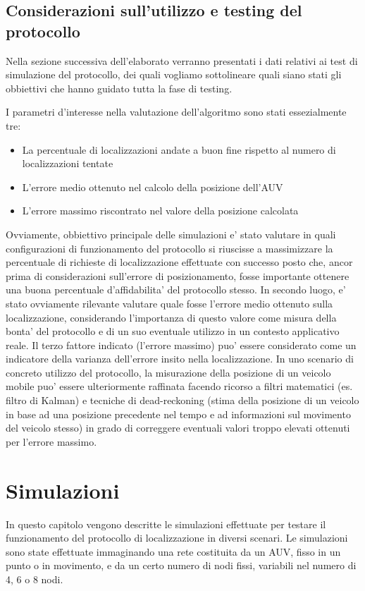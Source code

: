 \documentclass[Lau,binding=0.6cm]{sapthesis}
\begin{document}
\section{Considerazioni sull'utilizzo e testing del protocollo}
\par
Nella sezione successiva dell'elaborato verranno presentati i dati relativi ai test di simulazione del protocollo, dei quali vogliamo sottolineare quali siano stati gli obbiettivi che hanno guidato tutta la fase di testing.
\par
I parametri d'interesse nella valutazione  dell'algoritmo sono stati essezialmente tre:
\begin{itemize}
\item La percentuale di localizzazioni andate a buon fine rispetto al numero di localizzazioni tentate
\item L'errore medio ottenuto nel calcolo della posizione dell'AUV
\item L'errore massimo riscontrato nel valore della posizione calcolata
\end{itemize}
Ovviamente, obbiettivo principale delle simulazioni e' stato valutare in quali configurazioni di funzionamento del protocollo si riuscisse a massimizzare la percentuale di richieste di localizzazione effettuate con successo posto che, ancor prima di considerazioni sull'errore di posizionamento, fosse importante ottenere una buona percentuale d'affidabilita' del protocollo stesso.  In secondo luogo, e' stato ovviamente rilevante valutare quale fosse l'errore medio ottenuto sulla localizzazione, considerando l'importanza di questo valore come misura della bonta' del protocollo e di un suo eventuale utilizzo in un contesto applicativo reale. Il terzo fattore indicato (l'errore massimo) puo' essere considerato come un indicatore della varianza dell'errore insito nella localizzazione. In uno scenario di concreto utilizzo del protocollo, la misurazione della posizione di un veicolo mobile puo' essere ulteriormente raffinata facendo ricorso a filtri matematici (es. filtro di Kalman) e tecniche di dead-reckoning (stima della posizione  di un veicolo in base ad una posizione precedente nel tempo e ad informazioni sul movimento del veicolo stesso) in grado di correggere eventuali valori troppo elevati ottenuti per l'errore massimo.



\chapter{Simulazioni}
In questo capitolo vengono descritte le simulazioni effettuate per testare il funzionamento del protocollo di localizzazione in diversi scenari. \newline Le simulazioni sono state effettuate immaginando una rete costituita da un AUV, fisso in un punto o in movimento, e da un certo numero di nodi fissi, variabili nel numero di 4, 6 o 8 nodi.
\end{document}
